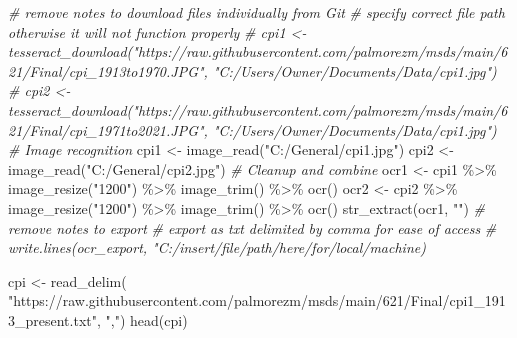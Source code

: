 \documentclass[
]{article}
\newenvironment{Shaded}{\begin{snugshade}}{\end{snugshade}}
\newcommand{\CommentTok}[1]{\textcolor[rgb]{0.56,0.35,0.01}{\textit{#1}}}
\newcommand{\FunctionTok}[1]{\textcolor[rgb]{0.00,0.00,0.00}{#1}}
\newcommand{\NormalTok}[1]{#1}
\newcommand{\OtherTok}[1]{\textcolor[rgb]{0.56,0.35,0.01}{#1}}
\newcommand{\SpecialCharTok}[1]{\textcolor[rgb]{0.00,0.00,0.00}{#1}}
\newcommand{\StringTok}[1]{\textcolor[rgb]{0.31,0.60,0.02}{#1}}
\begin{document}
\begin{Shaded}
\begin{Highlighting}[]
\CommentTok{\# remove notes to download files individually from Git}
\CommentTok{\# specify correct file path otherwise it will not function properly }
\CommentTok{\# cpi1 \textless{}{-} tesseract\_download("https://raw.githubusercontent.com/palmorezm/msds/main/621/Final/cpi\_1913to1970.JPG", "C:/Users/Owner/Documents/Data/cpi1.jpg")}
\CommentTok{\# cpi2 \textless{}{-} tesseract\_download("https://raw.githubusercontent.com/palmorezm/msds/main/621/Final/cpi\_1971to2021.JPG", "C:/Users/Owner/Documents/Data/cpi1.jpg")}
\CommentTok{\# Image recognition}
\NormalTok{cpi1 }\OtherTok{\textless{}{-}} \FunctionTok{image\_read}\NormalTok{(}\StringTok{"C:/General/cpi1.jpg"}\NormalTok{)}
\NormalTok{cpi2 }\OtherTok{\textless{}{-}} \FunctionTok{image\_read}\NormalTok{(}\StringTok{"C:/General/cpi2.jpg"}\NormalTok{)}
\CommentTok{\# Cleanup and combine}
\NormalTok{ocr1 }\OtherTok{\textless{}{-}}\NormalTok{ cpi1 }\SpecialCharTok{\%\textgreater{}\%} 
  \FunctionTok{image\_resize}\NormalTok{(}\StringTok{"1200"}\NormalTok{) }\SpecialCharTok{\%\textgreater{}\%} 
  \FunctionTok{image\_trim}\NormalTok{() }\SpecialCharTok{\%\textgreater{}\%} 
  \FunctionTok{ocr}\NormalTok{()}
\NormalTok{ocr2 }\OtherTok{\textless{}{-}}\NormalTok{ cpi2 }\SpecialCharTok{\%\textgreater{}\%} 
  \FunctionTok{image\_resize}\NormalTok{(}\StringTok{"1200"}\NormalTok{) }\SpecialCharTok{\%\textgreater{}\%} 
  \FunctionTok{image\_trim}\NormalTok{() }\SpecialCharTok{\%\textgreater{}\%} 
  \FunctionTok{ocr}\NormalTok{()}
\FunctionTok{str\_extract}\NormalTok{(ocr1, }\StringTok{""}\NormalTok{)}
\CommentTok{\# remove notes to export}
\CommentTok{\# export as txt delimited by comma for ease of access}
\CommentTok{\# write.lines(ocr\_export, "C:/insert/file/path/here/for/local/machine)}
\end{Highlighting}
\end{Shaded}

\begin{Shaded}
\begin{Highlighting}[]
\NormalTok{cpi }\OtherTok{\textless{}{-}} \FunctionTok{read\_delim}\NormalTok{(}
  \StringTok{"https://raw.githubusercontent.com/palmorezm/msds/main/621/Final/cpi1\_1913\_present.txt"}\NormalTok{, }\StringTok{","}\NormalTok{)}
\FunctionTok{head}\NormalTok{(cpi)}
\end{Highlighting}
\end{Shaded}
\end{document}
